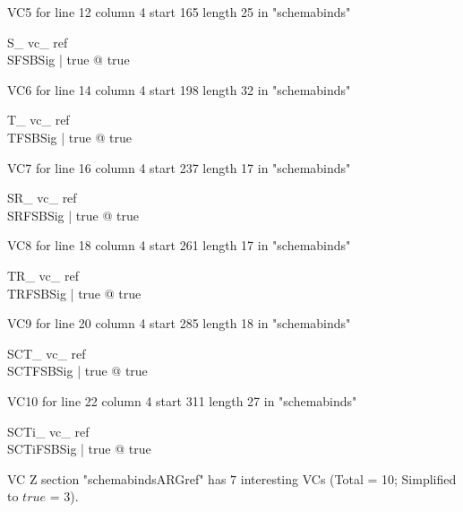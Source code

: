 \documentclass{article}
\begin{document}
VC5 for line 12 column 4 start 165 length 25 in "schemabinds"
\begin{theorem}{ S\_ vc\_ ref}\\
 \exists SFSBSig | true @ true \\

\end{theorem}

VC6 for line 14 column 4 start 198 length 32 in "schemabinds"
\begin{theorem}{ T\_ vc\_ ref}\\
 \exists TFSBSig | true @ true \\

\end{theorem}

VC7 for line 16 column 4 start 237 length 17 in "schemabinds"
\begin{theorem}{ SR\_ vc\_ ref}\\
 \exists SRFSBSig | true @ true \\

\end{theorem}

VC8 for line 18 column 4 start 261 length 17 in "schemabinds"
\begin{theorem}{ TR\_ vc\_ ref}\\
 \exists TRFSBSig | true @ true \\

\end{theorem}

VC9 for line 20 column 4 start 285 length 18 in "schemabinds"
\begin{theorem}{ SCT\_ vc\_ ref}\\
 \exists SCTFSBSig | true @ true \\

\end{theorem}

VC10 for line 22 column 4 start 311 length 27 in "schemabinds"
\begin{theorem}{ SCTi\_ vc\_ ref}\\
 \exists SCTiFSBSig | true @ true \\

\end{theorem}



 VC Z section "schemabindsARGref" has $7$ interesting VCs (Total = 10; Simplified to $true$ = 3).



\end{document}
